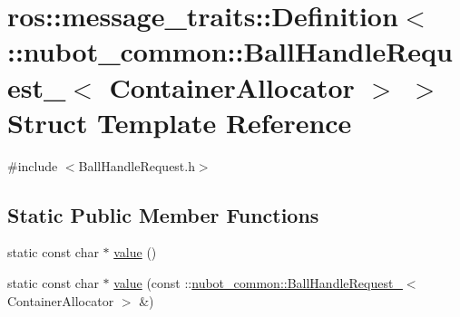 \hypertarget{structros_1_1message__traits_1_1Definition_3_01_1_1nubot__common_1_1BallHandleRequest___3_01ContainerAllocator_01_4_01_4}{\section{ros\-:\-:message\-\_\-traits\-:\-:Definition$<$ \-:\-:nubot\-\_\-common\-:\-:Ball\-Handle\-Request\-\_\-$<$ Container\-Allocator $>$ $>$ Struct Template Reference}
\label{structros_1_1message__traits_1_1Definition_3_01_1_1nubot__common_1_1BallHandleRequest___3_01ContainerAllocator_01_4_01_4}
}


{\ttfamily \#include $<$Ball\-Handle\-Request.\-h$>$}

\subsection*{Static Public Member Functions}
\begin{DoxyCompactItemize}
\item 
static const char $\ast$ \hyperlink{structros_1_1message__traits_1_1Definition_3_01_1_1nubot__common_1_1BallHandleRequest___3_01ContainerAllocator_01_4_01_4_a1d17db032eaf34042cd985ad89babd21}{value} ()
\item 
static const char $\ast$ \hyperlink{structros_1_1message__traits_1_1Definition_3_01_1_1nubot__common_1_1BallHandleRequest___3_01ContainerAllocator_01_4_01_4_add43ec66b1b2bd7940820c268b445e56}{value} (const \-::\hyperlink{structnubot__common_1_1BallHandleRequest__}{nubot\-\_\-common\-::\-Ball\-Handle\-Request\-\_\-}$<$ Container\-Allocator $>$ \&)
\end{DoxyCompactItemize}


